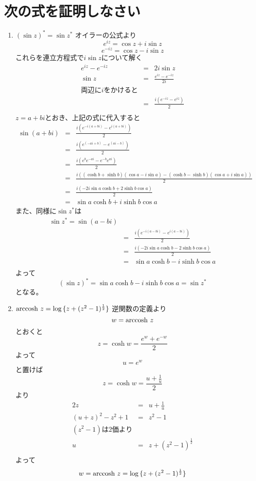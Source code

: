 \documentclass{jsarticle}
\begin{document}
\section{次の式を証明しなさい}
\begin{enumerate}[(1)]
  \item $(\sin{z})^*=\sin{z^*}$
    オイラーの公式より
    \[
      e^{iz}=\cos{z}+i\sin{z}
    \]
    \[
      e^{-iz}=\cos{z}-i\sin{z}
    \]
    これらを連立方程式で$i\sin{z}$について解く
    \begin{eqnarray*}
      e^{iz}-e^{-iz}&=&2i\sin{z} \\
      \sin{z}&=&\frac{e^{iz}-e^{-iz}}{2i} \\
      両辺にiをかけると&\\
      &=&\frac{i(e^{-iz}-e^{iz})}{2} \\
    \end{eqnarray*}
    $z=a+bi$とおき、上記の式に代入すると
    \begin{eqnarray*}
      \sin{(a+bi)}&=&\frac{i(e^{-i(a+bi)}-e^{i(a+bi)})}{2} \\
      &=&\frac{i(e^{(-ai+b)}-e^{(ai-b)})}{2} \\
      &=&\frac{i(e^be^{-ai}-e^{-b}e^{ai})}{2} \\
      &=&\frac{i((\cosh{b}+\sinh{b})(\cos{a}-i\sin{a})-(\cosh{b}-\sinh{b})(\cos{a}+i\sin{a}))}{2} \\
      &=&\frac{i(-2i\sin{a}\cosh{b}+2\sinh{b}\cos{a})}{2} \\
      &=&\sin{a}\cosh{b}+i\sinh{b}\cos{a}
    \end{eqnarray*}
    また、同様に$\sin{z^*}$は
    \begin{eqnarray*}
      \sin{z^*}=\sin{(a-bi)}\\
      &=&\frac{i(e^{-i(a-bi)}-e^{i(a-bi)})}{2} \\
      &=&\frac{i(-2i\sin{a}\cosh{b}-2\sinh{b}\cos{a})}{2}\\
      &=&\sin{a}\cosh{b}-i\sinh{b}\cos{a}\\
    \end{eqnarray*}
    よって
      \[
        (\sin{z})^*=\sin{a}\cosh{b}-i\sinh{b}\cos{a}=\sin{z^*}
      \]
    となる。
    \item ${\rm arccosh}\ z=\log{\{z+(z^2-1)^{\frac{1}{2}}\}}$
      逆関数の定義より
      \[
      w={\rm arccosh}\ z
      \]
      とおくと
      \[
        z=\cosh{w}=\frac{e^w+e^{-w}}{2}
      \]
      よって
      \[
      u=e^w
      \]
      と置けば
      \[
      z=\cosh{w}=\frac{u+\frac{1}{u}}{2}
      \]
      より
      \begin{eqnarray*}
        2z&=&u+\frac{1}{u}\\
        (u+z)^2-z^2+1&=&z^2-1\\
        (z^2-1)は2価より  \\
        u&=&z+(z^2-1)^{\frac{1}{2}} \\
      \end{eqnarray*}
      よって
      \[
      w={\rm arccosh}\ z=\log{\{z+(z^2-1)^{\frac{1}{2}}\}}
      \]
    \end{enumerate}
\end{document}
